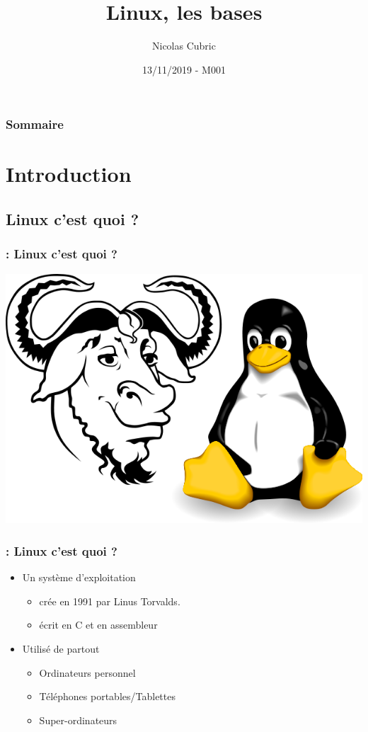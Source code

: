 \documentclass{beamer}
\title{Linux, les bases}
\author{Nicolas Cubric}
\date{13/11/2019 - M001}
\newenvironment{slide}[1]{
  \begin{frame}[environment=slide]
    \frametitle{\textbf{\insertsection}  : #1}}
{\end{frame}}
\begin{document}
\begin{frame}
\maketitle
\end{frame}

\begin{frame}
  \frametitle{Sommaire}
  \tableofcontents
\end{frame}

\section{Introduction}
\subsection{Linux c'est quoi ?}

\begin{slide}{Linux c'est quoi ?}
  \begin{center}
    \includegraphics[scale=0.25]{Images/GNU_TUX.png}
  \end{center}
\end{slide}

\begin{slide}{Linux c'est quoi ?}
  \begin{itemize}
    \item Un système d'exploitation
      \begin{itemize}
        \item crée en 1991 par Linus Torvalds.
        \item écrit en C et en assembleur
      \end{itemize}
    \item Utilisé de partout
    \begin{itemize}
      \item Ordinateurs personnel
      \item Téléphones portables/Tablettes
      \item Super-ordinateurs
    \end{itemize}
  \end{itemize}
\end{slide}
\end{document}
